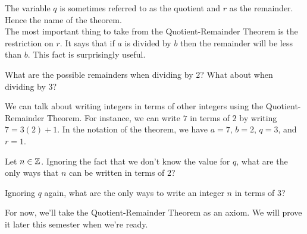 \noindent The variable $q$ is sometimes referred to as the quotient and $r$ as the remainder.  Hence the name of the theorem.\\

\noindent The most important thing to take from the Quotient-Remainder Theorem is the restriction on $r$.  It says that if $a$ is divided by $b$ then the remainder will be less than $b$.  This fact is surprisingly useful.\\

	\begin{question}[resume]
	\item What are the possible remainders when dividing by $2$?  What about when dividing by $3$?
	\vspace{.75in}
	\item We can talk about writing integers in terms of other integers using the Quotient-Remainder Theorem.  For instance, we can write $7$ in terms of $2$ by writing $7=3(2)+1$.  In the notation of the theorem, we have $a=7$, $b=2$, $q=3$, and $r=1$.
		\begin{qpart}
		\item Let $n \in \mathbb{Z}$.  Ignoring the fact that we don't know the value for $q$, what are the only ways that $n$ can be written in terms of $2$?
		\vspace{.75in}
		\item Ignoring $q$ again, what are the only ways to write an integer $n$ in terms of $3$?
		\vspace{.75in}
		\end{qpart}
	\end{question}

For now, we'll take the Quotient-Remainder Theorem as an axiom.  We will prove it later this semester when we're ready.




